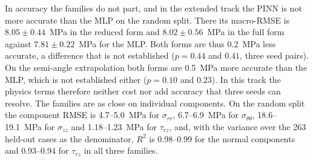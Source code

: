 \documentclass[subscriptcorrection,upint,varvw,barcolor=Goldenrod3,mathalfa=cal=euler,balance,hyphenate,french,pdf-a]{asmejour} %
\begin{document}
In accuracy the families do not part, and in the extended track the PINN is not more accurate than the MLP on the random split. There its macro-RMSE is $8.05\pm0.44$~MPa in the reduced form and $8.02\pm0.56$~MPa in the full form against $7.81\pm0.22$~MPa for the MLP. Both forms are thus 0.2~MPa less accurate, a difference that is not established ($p=0.44$ and $0.41$, three seed pairs). On the semi-angle extrapolation both forms are 0.5~MPa more accurate than the MLP, which is not established either ($p=0.10$ and $0.23$). In this track the physics terms therefore neither cost nor add accuracy that three seeds can resolve. The families are as close on individual components. On the random split the component RMSE is 4.7--5.0~MPa for $\sigma_{rr}$, 6.7--6.9~MPa for $\sigma_{\theta\theta}$, 18.6--19.1~MPa for $\sigma_{zz}$ and 1.18--1.23~MPa for $\tau_{rz}$, and, with the variance over the 263 held-out cases as the denominator, $R^2$ is 0.98--0.99 for the normal components and 0.93--0.94 for $\tau_{rz}$ in all three families.
\end{document}
